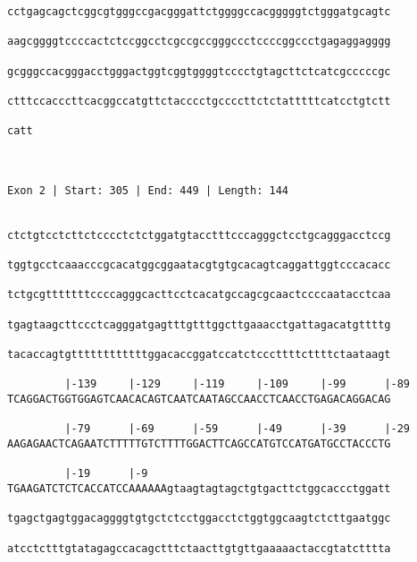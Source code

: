 \documentclass{article}
\begin{document}
\begin{Verbatim}
cctgagcagctcggcgtgggccgacgggattctggggccacgggggtctgggatgcagtc
                                                            
aagcggggtccccactctccggcctcgccgccgggccctccccggccctgagaggagggg
                                                            
gcgggccacgggacctgggactggtcggtggggtcccctgtagcttctcatcgcccccgc
                                                            
ctttccacccttcacggccatgttctacccctgccccttctctatttttcatcctgtctt
                                                            
catt
    
    
 
Exon 2 | Start: 305 | End: 449 | Length: 144


ctctgtcctcttctcccctctctggatgtacctttcccagggctcctgcagggacctccg
                                                            
tggtgcctcaaacccgcacatggcggaatacgtgtgcacagtcaggattggtcccacacc
                                                            
tctgcgtttttttccccagggcacttcctcacatgccagcgcaactccccaatacctcaa
                                                            
tgagtaagcttccctcagggatgagtttgtttggcttgaaacctgattagacatgttttg
                                                            
tacaccagtgttttttttttttggacaccggatccatctcccttttcttttctaataagt
                                                            
         |-139     |-129     |-119     |-109     |-99      |-89
TCAGGACTGGTGGAGTCAACACAGTCAATCAATAGCCAACCTCAACCTGAGACAGGACAG
                                                            
         |-79      |-69      |-59      |-49      |-39      |-29
AAGAGAACTCAGAATCTTTTTGTCTTTTGGACTTCAGCCATGTCCATGATGCCTACCCTG
                                                            
         |-19      |-9                                      
TGAAGATCTCTCACCATCCAAAAAAgtaagtagtagctgtgacttctggcaccctggatt
                                                            
tgagctgagtggacaggggtgtgctctcctggacctctggtggcaagtctcttgaatggc
                                                            
atcctctttgtatagagccacagctttctaacttgtgttgaaaaactaccgtatctttta
                                                            

\end{Verbatim}
\end{document}
